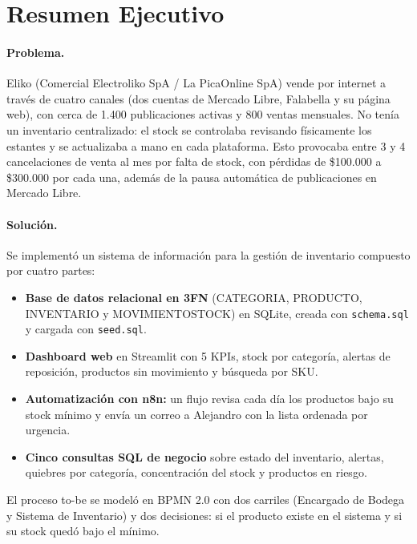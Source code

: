 \documentclass[11pt,letterpaper]{article}
\renewcommand{\_}{\oldus\allowbreak}
\begin{document}
\tableofcontents
\newpage

\section*{Resumen Ejecutivo}
\paragraph{Problema.} Eliko (Comercial Electroliko SpA / La PicaOnline SpA) vende por internet a través de cuatro canales (dos cuentas de Mercado Libre, Falabella y su página web), con cerca de 1.400 publicaciones activas y 800 ventas mensuales. No tenía un inventario centralizado: el stock se controlaba revisando físicamente los estantes y se actualizaba a mano en cada plataforma. Esto provocaba entre 3 y 4 cancelaciones de venta al mes por falta de stock, con pérdidas de \$100.000 a \$300.000 por cada una, además de la pausa automática de publicaciones en Mercado Libre.

\paragraph{Solución.} Se implementó un sistema de información para la gestión de inventario compuesto por cuatro partes:
\begin{itemize}
\item \textbf{Base de datos relacional en 3FN} (CATEGORIA, PRODUCTO, INVENTARIO y MOVIMIENTO\_STOCK) en SQLite, creada con \texttt{schema.sql} y cargada con \texttt{seed.sql}.
\item \textbf{Dashboard web} en Streamlit con 5 KPIs, stock por categoría, alertas de reposición, productos sin movimiento y búsqueda por SKU.
\item \textbf{Automatización con n8n:} un flujo revisa cada día los productos bajo su stock mínimo y envía un correo a Alejandro con la lista ordenada por urgencia.
\item \textbf{Cinco consultas SQL de negocio} sobre estado del inventario, alertas, quiebres por categoría, concentración del stock y productos en riesgo.
\end{itemize}
El proceso to-be se modeló en BPMN 2.0 con dos carriles (Encargado de Bodega y Sistema de Inventario) y dos decisiones: si el producto existe en el sistema y si su stock quedó bajo el mínimo.
\end{document}
